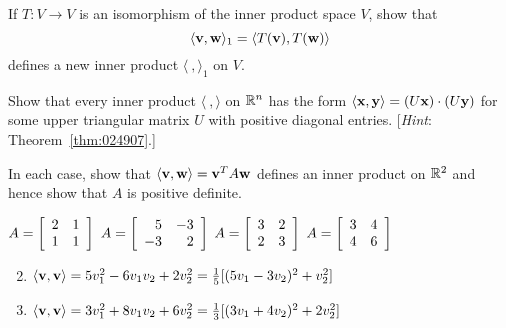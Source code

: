 \begin{multicols}{2}
\begin{ex}
If $T : V \to V$ is an isomorphism of the inner product space $V$, show that
\begin{equation*}
\langle \textbf{v}, \textbf{w} \rangle_1 = \langle T(\textbf{v}), T(\textbf{w}) \rangle
\end{equation*}
defines a new inner product $\langle\ , \rangle_{1}$ on $V$.
\end{ex}

\begin{ex}
Show that every inner product $\langle\ , \rangle$ on $\mathbb{R}^n$ has the form $\langle\textbf{x}, \textbf{y}\rangle = (U\textbf{x}) \cdot (U\textbf{y})$ for some upper triangular matrix $U$ with positive diagonal entries. [\textit{Hint}: Theorem~\ref{thm:024907}.]
\end{ex}

\begin{ex}
In each case, show that $\langle\textbf{v}, \textbf{w}\rangle = \textbf{v}^{T}A\textbf{w}$ defines an inner product on $\mathbb{R}^2$ and hence show that $A$ is positive definite.
\begin{exenumerate}
\exitem 
$A = 
\left[ \begin{array}{rr}
2 & 1 \\
1 & 1
\end{array} \right]$
\exitem 
$A =
\left[ \begin{array}{rr}
5 & -3 \\
-3 & 2
\end{array} \right]$
\exitem
$A =
\left[ \begin{array}{rr}
3 & 2 \\
2 & 3
\end{array} \right]$
\exitem 
$A = 
\left[ \begin{array}{rr}
3 & 4 \\
4 & 6
\end{array} \right]$
\end{exenumerate}
\begin{sol}
\begin{enumerate}[label={\alph*.}]
\setcounter{enumi}{1}
\item  $  \langle \textbf{v}, \textbf{v} \rangle = 5v_1^2 - 6v_1v_2 + 2v_2^2 = 
\tfrac{1}{5}[(5v_1 - 3v_2)^2 + v_2^2] $

\setcounter{enumi}{3}
\item  $ \langle \textbf{v}, \textbf{v} \rangle = 3v_1^2 + 8v_1v_2 + 6v_2^2 = 
\tfrac{1}{3}[(3v_1 + 4v_2)^2 + 2v_2^2] $

\end{enumerate}
\end{sol}
\end{ex}


\end{multicols}
